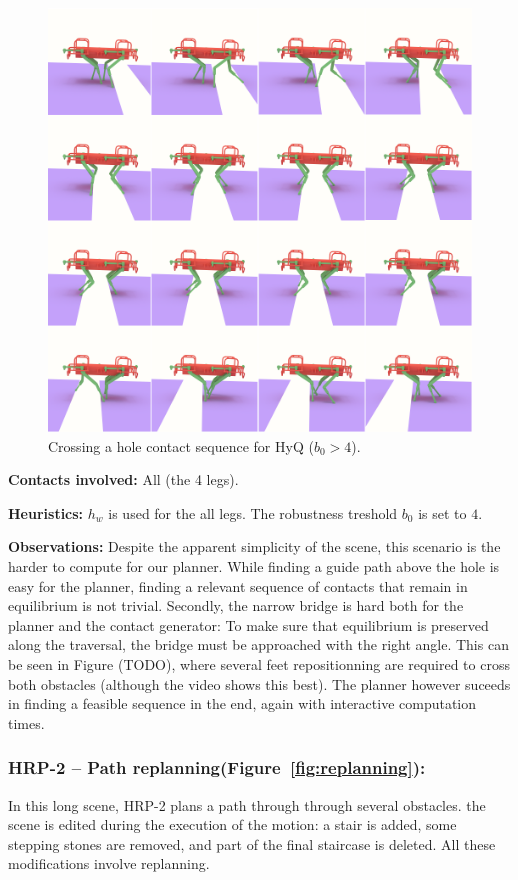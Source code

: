 \begin{figure}
  \centering
  \includegraphics[width=0.5\linewidth]{figures/hyq_obs}
  \caption{
           Crossing a hole contact sequence for HyQ ($b_0 > 4$). }
		   \label{fig:hyq_obs}
\end{figure}



\noindent\textbf{Contacts involved:} All (the 4 legs).

\noindent\textbf{Heuristics:} $h_w$ is used for the all legs. The robustness treshold $b_0$ is set to $4$.

\noindent\textbf{Observations:} Despite the apparent simplicity of the scene, this scenario is the harder to compute for our planner.
While finding a guide path above the hole is easy for the planner, finding a relevant sequence of contacts that remain in equilibrium is not trivial.
Secondly, the narrow bridge is hard both for the planner and the contact generator: To make sure that equilibrium is preserved along the traversal,
the bridge must be approached with the right angle.
This can be seen in Figure (TODO), where several feet repositionning are required to cross both obstacles (although the video shows this best).
The planner however suceeds in finding a feasible sequence in the end, again with interactive computation times.

\subsubsection{HRP-2 -- Path replanning(Figure~\ref{fig:replanning}):}
In this long scene, HRP-2 plans a path through through several obstacles. the scene is edited during the execution of the motion: a stair is added,
some stepping stones are removed, and part of the final staircase is deleted. All these modifications involve replanning.


